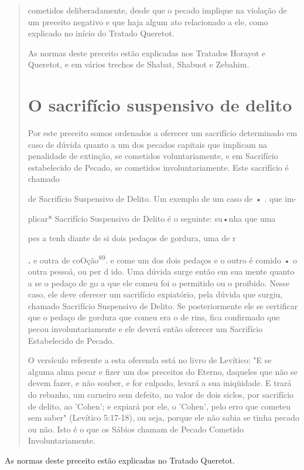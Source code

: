 \begin{quote}


cometidos deliberadamente, desde que o pecado implique na violação de um
preceito negativo e que haja algum ato relacionado a ele, como explicado
no início do Tratado Queretot.

As normas deste preceito estão explicadas nos Tratados Horayot e
Queretot, e em vários trechos de Shabat, Shabuot e Zebahim.

\section{O sacrifício suspensivo de delito}

Por este preceito somos ordenados a oferecer um sacrifício determi­nado
em caso de dúvida quanto a um dos pecados capitais que implicam na
penalidade de extinção, se cometidos voluntariamente, e em Sacrifício
estabe­lecido de Pecado, se cometidos involuntariamente. Este sacrifício
é chamado

de Sacrifício Suspensivo de Delito. Um exemplo de um caso de • . que im-

plicar* Sacrifício Suspensivo de Delito é o seguinte: su•nha que uma

pes a tenh diante de si dois pedaços de gordura, uma de r

\textbf{.} e outra de coOção\textsuperscript{89}. e
come um dos dois pedaços e o outro é comido • o outra pes­soá, ou per d
ido. Uma dúvida surge então em sua mente quanto a se o pedaço de go a
que ele comeu foi o permitido ou o proibido. Nesse caso, ele deve
oferecer um sacrifício expiatório, pela dúvida que surgiu, chamado
Sacrifício Suspensivo de Delito. Se posteriormente ele se certificar que
o pedaço de gor­dura que comeu era o de rins, fica confirmado que pecou
involuntariamente e ele deverá então oferecer um Sacrifício Estabelecido
de Pecado.

O versículo referente a esta oferenda está no livro de Levítico: "E se
alguma alma pecar e fizer um dos preceitos do Eterno, daqueles que não
se devem fazer, e não souber, e for culpado, levará a sua iniqüidade. E
trará do rebanho, um carneiro sem defeito, no valor de dois siclos, por
sacrifício de de­lito, ao 'Cohen'; e expiará por ele, o 'Cohen', pelo
erro que cometeu sem sa­ber" (Levítico 5:17-18), ou seja, porque ele não
sabia se tinha pecado ou não. Isto é o que os Sábios chamam de Pecado
Cometido Involuntariamente.
\end{quote}

As normas deste preceito estão explicadas no Tratado Queretot.

